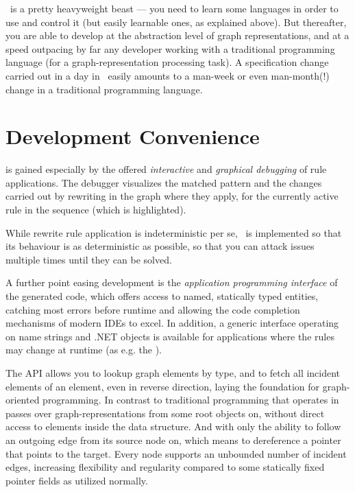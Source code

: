 \GrG\ is a pretty heavyweight beast --- you need to learn some languages in order to use and control it (but easily learnable ones, as explained above).
But thereafter, you are able to develop at the abstraction level of graph representations, and at a speed outpacing by far any developer working with a traditional programming language (for a graph-representation processing task).
A specification change carried out in a day in \GrG\ easily amounts to a man-week or even man-month(!) change in a traditional programming language.

\section{Development Convenience}
is gained especially by the offered \emph{interactive} and \emph{graphical debugging} of rule applications.
The debugger visualizes the matched pattern and the changes carried out by rewriting in the graph where they apply,
for the currently active rule in the sequence (which is highlighted).

While rewrite rule application is indeterministic per se, \GrG\ is implemented so that its behaviour is as deterministic as possible, so that you can attack issues multiple times until they can be solved.

A further point easing development is the \emph{application programming interface} of the generated code,
which offers access to named, statically typed entities, catching most errors before runtime and allowing the code completion mechanisms of modern IDEs to excel.
In addition, a generic interface operating on name strings and .NET objects is available for applications where the rules may change at runtime (as e.g. the \GrShell).

The API allows you to lookup graph elements by type, and to fetch all incident elements of an element, even in reverse direction, laying the foundation for graph-oriented programming.
In contrast to traditional programming that operates in passes over graph-representations from some root objects on, without direct access to elements inside the data structure. 
And with only the ability to follow an outgoing edge from its source node on, which means to dereference a pointer that points to the target.
Every node supports an unbounded number of incident edges, increasing flexibility and regularity compared to some statically fixed pointer fields as utilized normally.

